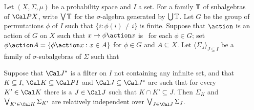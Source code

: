 Let $(X,\Sigma,\mu)$ be a probability space and
$I$ a set.   For a family $\Bbb T$ of subalgebras of $\Cal PX$,
write $\bigvee\Bbb T$ for the $\sigma$-algebra generated by
$\bigcup\Bbb T$.
Let $G$ be the group of permutations $\phi$ of $I$ such that
$\{i:\phi(i)\ne i\}$ is finite.   Suppose that $\action$ is an action of
$G$ on $X$ such that $x\mapsto\phi\action x$ is \imp\ for each $\phi\in G$;
set $\phi\action A=\{\phi\action x:x\in A\}$ for $\phi\in G$ and
$A\subseteq X$.
Let $\langle\Sigma_J\rangle_{J\subseteq I}$ be a family of
$\sigma$-subalgebras of $\Sigma$ such that


\noindent Suppose that $\Cal J^*$ is a filter on $I$ not containing any
infinite set, and that $K\subseteq I$, $\Cal K\subseteq\Cal PI$ and
$\Cal J\subseteq\Cal J^*$ are such that for every $K'\in\Cal K$ there is a
$J\in\Cal J$ such that $K\cap K'\subseteq J$.
Then $\Sigma_K$ and $\bigvee_{K'\in\Cal K}\Sigma_{K'}$
are relatively independent over $\bigvee_{J\in\Cal J}\Sigma_J$.

